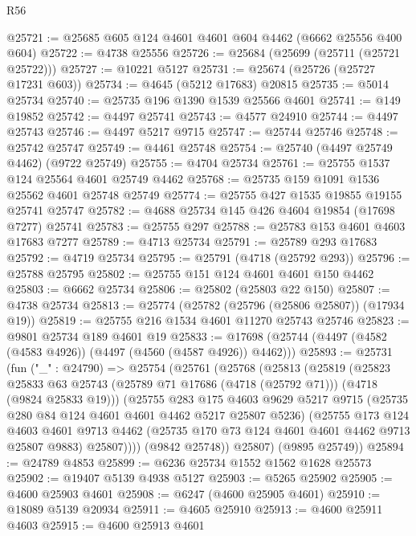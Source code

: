 \begin{lexlean}{R56}
\begin{coremodule}
@25721 := @25685 @605 @124 @4601 @4601 @604 @4462 (@6662 @25556 @400 @604)
@25722 := @4738 @25556
@25726 := @25684 (@25699 (@25711 (@25721 @25722)))
@25727 := @10221 @5127
@25731 := @25674 (@25726 (@25727 @17231 @603))
@25734 := @4645 (@5212 @17683) @20815
@25735 := @5014 @25734
@25740 := @25735 @196 @1390 @1539 @25566 @4601
@25741 := @149 @19852
@25742 := @4497 @25741
@25743 := @4577 @24910
@25744 := @4497 @25743
@25746 := @4497 @5217 @9715
@25747 := @25744 @25746
@25748 := @25742 @25747
@25749 := @4461 @25748
@25754 := @25740 (@4497 @25749 @4462) (@9722 @25749)
@25755 := @4704 @25734
@25761 := @25755 @1537 @124 @25564 @4601 @25749 @4462
@25768 := @25735 @159 @1091 @1536 @25562 @4601 @25748 @25749
@25774 := @25755 @427 @1535 @19855 @19155 @25741 @25747
@25782 := @4688 @25734 @145 @426 @4604 @19854 (@17698 @7277) @25741
@25783 := @25755 @297
@25788 := @25783 @153 @4601 @4603 @17683 @7277
@25789 := @4713 @25734
@25791 := @25789 @293 @17683
@25792 := @4719 @25734
@25795 := @25791 (@4718 (@25792 @293))
@25796 := @25788 @25795
@25802 := @25755 @151 @124 @4601 @4601 @150 @4462
@25803 := @6662 @25734
@25806 := @25802 (@25803 @22 @150)
@25807 := @4738 @25734
@25813 := @25774 (@25782 (@25796 (@25806 @25807)) (@17934 @19))
@25819 := @25755 @216 @1534 @4601 @11270 @25743 @25746
@25823 := @9801 @25734 @189 @4601 @19
@25833 := @17698 (@25744 (@4497 (@4582 (@4583 @4926)) (@4497 (@4560 (@4587 @4926)) @4462)))
@25893 := @25731
    (fun ("_" : @24790) =>
    @25754
      (@25761
        (@25768
          (@25813
            (@25819
              (@25823
                @25833
                @63
                @25743
                (@25789 @71 @17686 (@4718 (@25792 @71)))
                (@4718 (@9824 @25833 @19)))
              (@25755
                @283
                @175
                @4603
                @9629
                @5217
                @9715
                (@25735 @280 @84 @124 @4601 @4601 @4462 @5217 @25807 @5236)
                (@25755
                  @173
                  @124
                  @4603
                  @4601
                  @9713
                  @4462
                  (@25735 @170 @73 @124 @4601 @4601 @4462 @9713 @25807 @9883)
                  @25807))))
          (@9842 @25748))
        @25807)
      (@9895 @25749))
@25894 := @24789 @4853
@25899 := @6236 @25734 @1552 @1562 @1628 @25573
@25902 := @19407 @5139 @4938 @5127
@25903 := @5265 @25902
@25905 := @4600 @25903 @4601
@25908 := @6247 (@4600 @25905 @4601)
@25910 := @18089 @5139 @20934
@25911 := @4605 @25910
@25913 := @4600 @25911 @4603
@25915 := @4600 @25913 @4601

\end{coremodule}
\end{lexlean}
